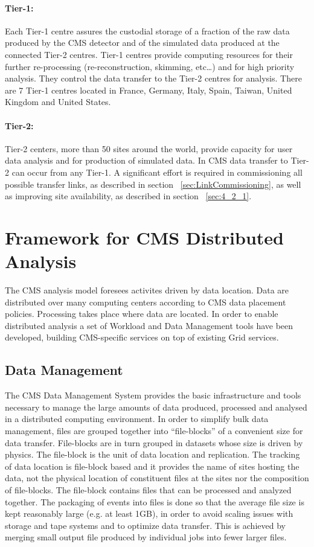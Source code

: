 \paragraph{Tier-1:} 
Each Tier-1 centre assures the custodial storage of a fraction of the raw data produced by the CMS detector and of the simulated data produced at the connected Tier-2 centres. Tier-1 centres provide computing resources for their further re-processing (re-reconstruction, skimming, etc…) and for high priority analysis.
They control the data transfer to the Tier-2 centres for analysis. There are 7 Tier-1 centres located in France, Germany, Italy, Spain, Taiwan, United Kingdom and United States.

\paragraph{Tier-2:}
Tier-2 centers, more than 50 sites around the world,  provide capacity for user data analysis and for production of simulated data.
In CMS data transfer to Tier-2 can occur from any Tier-1. A significant effort is required in 
commissioning all possible transfer links, as described in section ~\ref{sec:LinkCommissioning}, as well
as improving site availability, as described in section ~\ref{sec:4_2_1}.

\section{Framework for CMS Distributed Analysis}
\label{sec:3}
The CMS analysis model foresees activites driven by data location. Data are distributed over many computing centers according to CMS data placement policies. Processing takes place where data are located. In order to enable distributed analysis a set of Workload and Data Management tools have been developed, building CMS-specific services on top of existing Grid services.

\subsection{Data Management}
\label{sec:3_1}
The CMS Data Management System provides the basic infrastructure and tools necessary to manage the large amounts of data produced, processed and analysed in a distributed computing environment. 
In order to simplify bulk data management, files are grouped together into “file-blocks”  of a convenient size for data transfer. 
File-blocks are in turn grouped in datasets whose size is driven by physics.
The file-block is the unit of data location and replication. 
The tracking of data location is file-block based and it provides the name of sites hosting the data, not the physical location of constituent files at the sites nor the composition of file-blocks.
The file-block contains files that can be processed and analyzed together.
The packaging of events into files is done so that the average file size is
kept reasonably large (e.g. at least 1GB), in order to avoid scaling issues with storage and tape systems and to optimize data transfer.
This is achieved by merging small output file produced by individual jobs into fewer larger files.



